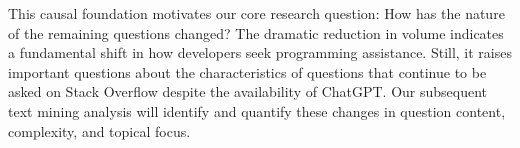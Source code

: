 This causal foundation motivates our core research question: How has the nature of the remaining questions changed? The dramatic reduction in volume indicates a fundamental shift in how developers seek programming assistance. Still, it raises important questions about the characteristics of questions that continue to be asked on Stack Overflow despite the availability of ChatGPT. Our subsequent text mining analysis will identify and quantify these changes in question content, complexity, and topical focus.
